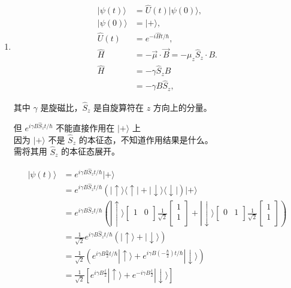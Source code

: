 \documentclass[lang=cn,10pt]{elegantbook}
\begin{document}
\begin{solution}
	\begin{enumerate}
		\item \begin{align*}
		|\psi(t)\rangle &= \hat{U}(t) |\psi(0)\rangle, \\
		|\psi(0)\rangle &= |+\rangle, \\
		\hat{U}(t) &= e^{-i \hat{H} t / \hbar}, \\
		\hat{H} &= -\vec{\mu} \cdot \vec{B} = -\mu_z \hat{S}_z \cdot B.\\
		\hat{H} &= -\gamma \hat{S}_z B \\
		&= -\gamma B \hat{S}_z,
		\end{align*}
		
		其中 $\gamma$ 是旋磁比，$\hat{S}_z$ 是自旋算符在 $z$ 方向上的分量。
		
		但 $e^{i \gamma B \hat{S}_z t / \hbar}$ 不能直接作用在 $|+\rangle$ 上 \\
		因为 $|+\rangle$ 不是 $\hat{S}_z$ 的本征态，不知道作用结果是什么。 \\
		需将其用 $\hat{S}_z$ 的本征态展开。
		
		\begin{align*}
			|\psi(t)\rangle &= e^{i \gamma B \hat{S}_z t / \hbar} |+\rangle \\
			&= e^{i \gamma B \hat{S}_z t / \hbar} (| \uparrow \rangle \langle \uparrow | + | \downarrow \rangle \langle \downarrow |) |+\rangle \\
			&= e^{i\gamma B\hat{S}_zt/\hbar}\left( |\uparrow \rangle \left[ \begin{matrix}
				1&		0\\
			\end{matrix} \right] \frac{1}{\sqrt{2}}\left[ \begin{array}{c}
				1\\
				1\\
			\end{array} \right] +|\downarrow \rangle \left[ \begin{matrix}
				0&		1\\
			\end{matrix} \right] \frac{1}{\sqrt{2}}\left[ \begin{array}{c}
				1\\
				1\\
			\end{array} \right] \right)  \\
			&= \frac{1}{\sqrt{2}} e^{i \gamma B \hat{S}_z t / \hbar} (| \uparrow \rangle + | \downarrow \rangle) \\
			&= \frac{1}{\sqrt{2}} \left( e^{i \gamma B \frac{\hbar}{2} t / \hbar} | \uparrow \rangle + e^{i \gamma B \left(-\frac{\hbar}{2}\right) t / \hbar} | \downarrow \rangle \right) \\
			&= \frac{1}{\sqrt{2}} \left[ e^{i \gamma B \frac{t}{2}} | \uparrow \rangle + e^{-i \gamma B \frac{t}{2}} | \downarrow \rangle \right]
		\end{align*}
		

\end{enumerate}
\end{solution}
\end{document}
